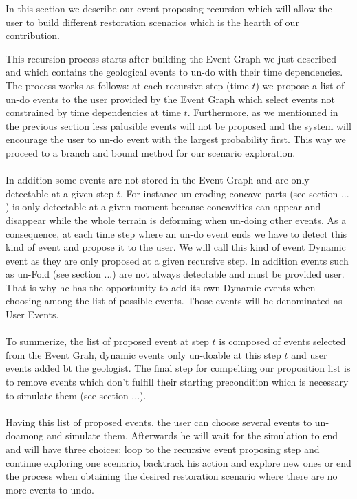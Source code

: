 \documentclass[12pt, a4paper]{report} %
\begin{document}
In this section we describe our event proposing recursion which will allow the user to build different restoration scenarios which is the hearth of our contribution.

This recursion process starts after building the Event Graph we just described and which contains the geological events to un-do with their time dependencies. The process works as follows: at each recursive step (time $t$) we propose a list of un-do events to the user provided by the Event Graph which select events not constrained by time dependencies at time $t$. Furthermore, as we mentionned in the previous section less palusible events will not be proposed and the system will encourage the user to un-do event with the largest probability first. This way we proceed to a branch and bound method for our scenario exploration. \\\\
In addition some events are not stored in the Event Graph and are only detectable at a given step $t$. For instance un-eroding concave parts (see section ... ) is only detectable at a given moment because concavities can appear and disappear while the whole terrain is deforming when un-doing other events. As a consequence, at each time step where an un-do event ends we have to detect this kind of event and propose it to the user. We will call this kind of event Dynamic event as they are only proposed at a given recursive step. In addition events such as un-Fold (see section ...) are not always detectable and must be provided user. That is why he has the opportunity to add its own Dynamic events when choosing among the list of possible events. Those events will be denominated as User Events.\\\\
To summerize, the list of proposed event at step $t$ is composed of events selected from the Event Grah, dynamic events only un-doable at this step $t$ and user events added bt the geologist. The final step for compelting our proposition list is to remove events which don't fulfill their starting precondition which is necessary to simulate them (see section ...).\\\\
Having this list of proposed events, the user can choose several events to un-doamong and simulate them. Afterwards he will wait for the simulation to end and will have three choices: loop to the recursive event proposing step and continue exploring one scenario, backtrack his action and explore new ones or end the process when obtaining the desired restoration scenario where there are no more events to undo.\\\\
\end{document}
